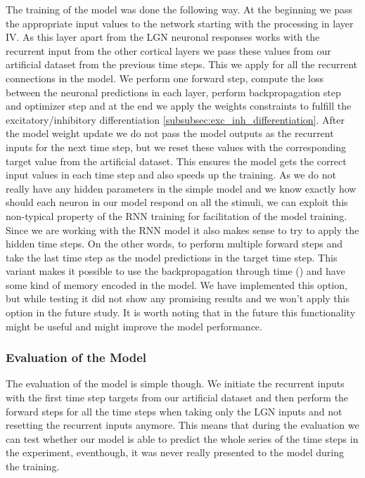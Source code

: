 The training of the model was done the following way. At the beginning we pass the appropriate input values to the network starting with the processing in layer IV. As this layer apart from the LGN neuronal responses works with the recurrent input from the other cortical layers we pass these values from our artificial dataset from the previous time steps. This we apply for all the recurrent connections in the model. We perform one forward step, compute the loss between the neuronal predictions in each layer, perform backpropagation step and optimizer step and at the end we apply the weights constraints to fulfill the excitatory/inhibitory differentiation \ref{subsubsec:exc_inh_differentiation}. After the model weight update we do not pass the model outputs as the recurrent inputs for the next time step, but we reset these values with the corresponding target value from the artificial dataset. This ensures the model gets the correct input values in each time step and also speeds up the training. As we do not really have any hidden parameters in the simple model and we know exactly how should each neuron in our model respond on all the stimuli, we can exploit this non-typical property of the RNN training for facilitation of the model training. Since we are working with the RNN model it also makes sense to try to apply the hidden time steps. On the other words, to perform multiple forward steps and take the last time step as the model predictions in the target time step. This variant makes it possible to use the backpropagation through time (\citet{webos1990btt}) and have some kind of memory encoded in the model. We have implemented this option, but while testing it did not show any promising results and we won't apply this option in the future study. It is worth noting that in the future this functionality might be useful and might improve the model performance.

\subsubsection{Evaluation of the Model}
\label{subsubsec:evaluation_model}

The evaluation of the model is simple though. We initiate the recurrent inputs with the first time step targets from our artificial dataset and then perform the forward steps for all the time steps when taking only the LGN inputs and not resetting the recurrent inputs anymore. This means that during the evaluation we can test whether our model is able to predict the whole series of the time steps in the experiment, eventhough, it was never really presented to the model during the training.

